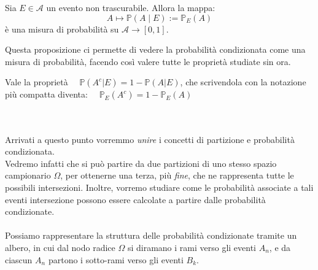\begin{proposizione}
\label{prop:mappa_condizionata}
    Sia $E \in \mathcal{A}$ un evento non trascurabile. Allora la mappa:
    \[
    A \longmapsto \mathbb{P}(A \mid E) := \mathbb{P}_E(A)
    \]
    è una misura di probabilità su $\mathcal{A}\rightarrow [0,1]$.
\end{proposizione}
Questa proposizione ci permette di vedere la probabilità condizionata come una misura di probabilità, facendo così valere tutte le proprietà studiate sin ora.
\begin{esempio}
    Vale la proprietà $\quad \mathbb{P}(A^c|E) = 1 - \mathbb{P}(A|E)$, che scrivendola con la notazione più compatta diventa: $\quad \mathbb{P}_E(A^c) = 1 - \mathbb{P}_E(A) $
\end{esempio}
\bigskip
\noindent
{}\\
\\
Arrivati a questo punto vorremmo \textit{unire} i concetti di partizione e probabilità condizionata.\\
Vedremo infatti che si può partire da due partizioni di uno stesso spazio campionario $\Omega$, per ottenerne una terza, più \emph{fine}, che ne rappresenta tutte le possibili intersezioni. Inoltre, vorremo studiare come le probabilità associate a tali eventi intersezione possono essere calcolate a partire dalle probabilità condizionate.\\
\\
Possiamo rappresentare la struttura delle probabilità condizionate tramite un albero, in cui dal nodo radice $\Omega$ si diramano i rami verso gli eventi $A_n$, e da ciascun $A_n$ partono i sotto-rami verso gli eventi $B_k$.
